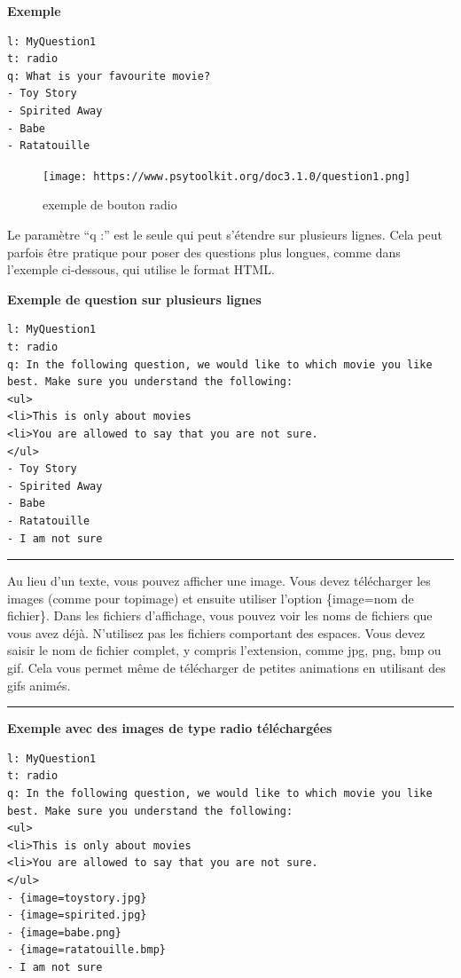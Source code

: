 \documentclass[
]{book}
\begin{document}
\textbf{Exemple}

\begin{verbatim}
l: MyQuestion1
t: radio
q: What is your favourite movie?
- Toy Story
- Spirited Away
- Babe
- Ratatouille
\end{verbatim}

\begin{figure}
\centering
\texttt{[image: https://www.psytoolkit.org/doc3.1.0/question1.png]}
\caption{exemple de bouton radio}
\end{figure}

Le paramètre ``q :'' est le seule qui peut s'étendre sur plusieurs lignes. Cela peut parfois être pratique pour poser des questions plus longues, comme dans l'exemple ci-dessous, qui utilise le format HTML.

\textbf{Exemple de question sur plusieurs lignes}

\begin{verbatim}
l: MyQuestion1
t: radio
q: In the following question, we would like to which movie you like
best. Make sure you understand the following:
<ul>
<li>This is only about movies
<li>You are allowed to say that you are not sure.
</ul>
- Toy Story
- Spirited Away
- Babe
- Ratatouille
- I am not sure
\end{verbatim}

\begin{center}\rule{0.5\linewidth}{\linethickness}\end{center}

Au lieu d'un texte, vous pouvez afficher une image. Vous devez télécharger les images (comme pour topimage) et ensuite utiliser l'option \{image=nom de fichier\}. Dans les fichiers d'affichage, vous pouvez voir les noms de fichiers que vous avez déjà. N'utilisez pas les fichiers comportant des espaces. Vous devez saisir le nom de fichier complet, y compris l'extension, comme jpg, png, bmp ou gif. Cela vous permet même de télécharger de petites animations en utilisant des gifs animés.

\begin{center}\rule{0.5\linewidth}{\linethickness}\end{center}

\textbf{Exemple avec des images de type radio téléchargées}

\begin{verbatim}
l: MyQuestion1
t: radio
q: In the following question, we would like to which movie you like
best. Make sure you understand the following:
<ul>
<li>This is only about movies
<li>You are allowed to say that you are not sure.
</ul>
- {image=toystory.jpg}
- {image=spirited.jpg}
- {image=babe.png}
- {image=ratatouille.bmp}
- I am not sure
\end{verbatim}
\end{document}
